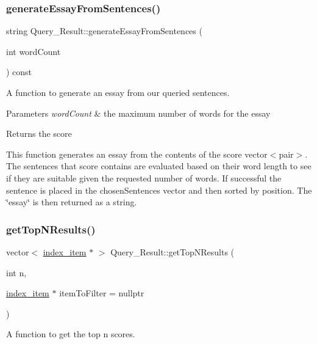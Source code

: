 \subsubsection{\texorpdfstring{generate\+Essay\+From\+Sentences()}{generateEssayFromSentences()}}
{\footnotesize\ttfamily string Query\+\_\+\+Result\+::generate\+Essay\+From\+Sentences (\begin{DoxyParamCaption}\item[{int}]{word\+Count }\end{DoxyParamCaption}) const}



A function to generate an essay from our queried sentences. 


\begin{DoxyParams}{Parameters}
{\em word\+Count} & the maximum number of words for the essay \\
\hline
\end{DoxyParams}
\begin{DoxyReturn}{Returns}
the score
\end{DoxyReturn}
This function generates an essay from the contents of the score vector$<$pair$>$. The sentences that score contains are evaluated based on their word length to see if they are suitable given the requested number of words. If successful the sentence is placed in the chosen\+Sentences vector and then sorted by position. The \char`\"{}essay\char`\"{} is then returned as a string. \mbox{\label{class_query___result_a05014e96b4883c7ca78c7bd3b2e457d8}} 
\subsubsection{\texorpdfstring{get\+Top\+N\+Results()}{getTopNResults()}}
{\footnotesize\ttfamily vector$<$ \hyperlink{classindex__item}{index\+\_\+item} $\ast$ $>$ Query\+\_\+\+Result\+::get\+Top\+N\+Results (\begin{DoxyParamCaption}\item[{int}]{n,  }\item[{\hyperlink{classindex__item}{index\+\_\+item} $\ast$}]{item\+To\+Filter = {\ttfamily nullptr} }\end{DoxyParamCaption})}



A function to get the top n scores. 


